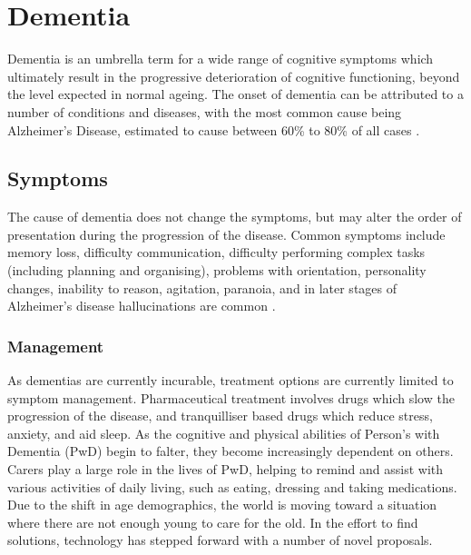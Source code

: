 \section{Dementia}
Dementia is an umbrella term for a wide range of cognitive symptoms which ultimately result in the progressive deterioration of cognitive functioning, beyond the level expected in normal ageing. The onset of dementia can be attributed to a number of conditions and diseases, with the most common cause being Alzheimer's Disease, estimated to cause between 60\% to 80\% of all cases \cite{2015AlzheimersDiseaseFactsFigures}.  

\subsection{Symptoms}
The cause of dementia does not change the symptoms, but may alter the order of presentation during the progression of the disease. Common symptoms include memory loss, difficulty communication, difficulty performing complex tasks (including planning and organising), problems with orientation, personality changes, inability to reason, agitation, paranoia, and in later stages of Alzheimer's disease hallucinations are common \cite{NationalHealthService2015}.

\subsubsection{Management}
As dementias are currently incurable, treatment options are currently limited to symptom management. Pharmaceutical treatment involves drugs which slow the progression of the disease, and tranquilliser based drugs which reduce stress, anxiety, and aid sleep. As the cognitive and physical abilities of Person's with Dementia (PwD) begin to falter, they become increasingly dependent on others. 
Carers play a large role in the lives of PwD, helping to remind and assist with various activities of daily living, such as eating, dressing and taking medications. Due to the shift in age demographics, the world is moving toward a situation where there are not enough young to care for the old. In the effort to find solutions, technology has stepped forward with a number of novel proposals.

